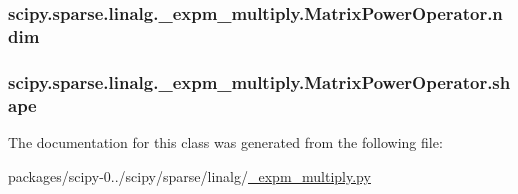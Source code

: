 \subsubsection[{ndim}]{\setlength{\rightskip}{0pt plus 5cm}scipy.\+sparse.\+linalg.\+\_\+expm\+\_\+multiply.\+Matrix\+Power\+Operator.\+ndim}\label{classscipy_1_1sparse_1_1linalg_1_1__expm__multiply_1_1MatrixPowerOperator_a60b71ba6ecb041ac1834c09e3f9cd67f}
\hypertarget{classscipy_1_1sparse_1_1linalg_1_1__expm__multiply_1_1MatrixPowerOperator_a1a36cd5153fc69c2db9effe66a44ee63}{}
\subsubsection[{shape}]{\setlength{\rightskip}{0pt plus 5cm}scipy.\+sparse.\+linalg.\+\_\+expm\+\_\+multiply.\+Matrix\+Power\+Operator.\+shape}\label{classscipy_1_1sparse_1_1linalg_1_1__expm__multiply_1_1MatrixPowerOperator_a1a36cd5153fc69c2db9effe66a44ee63}


The documentation for this class was generated from the following file\+:\begin{DoxyCompactItemize}
\item 
packages/scipy-\/0../scipy/sparse/linalg/\hyperlink{__expm__multiply_8py}{\+\_\+expm\+\_\+multiply.\+py}\end{DoxyCompactItemize}
